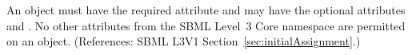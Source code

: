An \InitialAssignment object must have the required attribute
 and may have the optional attributes  and
.  No other attributes from the SBML Level~3 Core namespace
are permitted on an \InitialAssignment object.  (References: SBML L3V1
Section~\ref{sec:initialAssignment}.)
